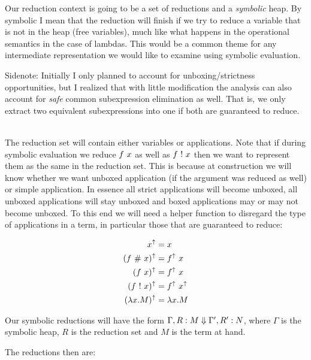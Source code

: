 \documentclass[a4paper]{article}
\begin{document}
Our reduction context is going to be a set of reductions and a \emph{symbolic} heap. By symbolic I mean that the reduction will finish if we try to reduce a variable that is not in the heap (free variables), much like what happens in the operational semantics in the case of lambdas. This would be a common theme for any intermediate representation we would like to examine using symbolic evaluation.

Sidenote: Initially I only planned to account for unboxing/strictness opportunities, but I realized that with little modification the analysis can also account for \emph{safe} common subexpression elimination as well. That is, we only extract two equivalent subexpressions into one if both are guaranteed to reduce.

\mbox{}\\


The reduction set will contain either variables or applications. Note that if during symbolic evaluation we reduce $f \  x$ as well as $f \ !\  x$ then we want to represent them as the same in the reduction set. This is because at construction we will know whether we want unboxed application (if the argument was reduced as well) or simple application. In essence all strict applications will become unboxed, all unboxed applications will stay unboxed and boxed applications may or may not become unboxed. To this end we will need a helper function to disregard the type of applications in a term, in particular those that are guaranteed to reduce:

\newcommand{\uppity}[1]{#1^{\uparrow}}

\begin{align*}
  \uppity{x} &= x\\
  \uppity{(f \unboxed x)} &= \uppity{f} \app x\\
  \uppity{(f \app x)} &= \uppity{f} \app x\\
  \uppity{(f \strict x)} &= \uppity{f} \app \uppity{x}\\
  \uppity{(\lambda x. M)} &= \lambda x. M
\end{align*}


Our symbolic reductions will have the form $\Gamma, R : M \Downarrow \Gamma', R' : N$, where $\Gamma$ is the symbolic heap, $R$ is the reduction set and $M$ is the term at hand.

The reductions then are:
\end{document}
